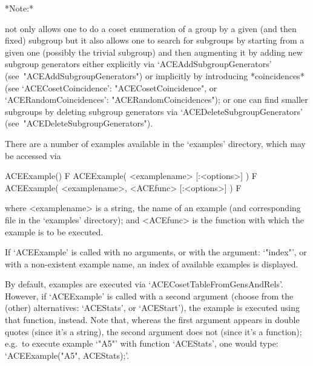 \enditems

*Note:*

{\ACE} not only allows one to do a coset enumeration of a group  by  a
given (and then fixed) subgroup but it also allows one to  search  for
subgroups by starting from a given one (possibly the trivial subgroup)
and then augmenting  it  by  adding  new  subgroup  generators  either
explicitly               via                `ACEAddSubgroupGenerators'
(see~"ACEAddSubgroupGenerators")   or   implicitly   by    introducing
*coincidences*     (see     `ACECosetCoincidence':
"ACECosetCoincidence",           or           `ACERandomCoincidences':
"ACERandomCoincidences");  or  one  can  find  smaller  subgroups   by
deleting   subgroup   generators   via   `ACEDeleteSubgroupGenerators'
(see~"ACEDeleteSubgroupGenerators").


\beginitems

There are a number of examples available in the `examples'  directory,
which may be accessed via

\>ACEExample() F
\>ACEExample( <examplename> [:<options>] ) F
\>ACEExample( <examplename>, <ACEfunc> [:<options>] ) F

where  <examplename>  is  a  string,  the  name  of  an  example  (and
corresponding file in the `examples' directory); and <ACEfunc> is  the
{\ACE} function with which the example is to be executed. 

If `ACEExample' is called with no arguments,  or  with  the  argument:
`"index"', or with a non-existent example name, an index of  available
examples is displayed.

By default, examples are executed via  `ACECosetTableFromGensAndRels'.
However, if `ACEExample' is called with a second argument (choose from
the (other) alternatives: `ACEStats', or `ACEStart'), the  example  is
executed using that function, instead. Note that,  whereas  the  first
argument appears in double quotes (since it's a  string),  the  second
argument does not (since it's a  function);  e.g.~to  execute  example
`"A5"' with function `ACEStats',  one  would  type:  `ACEExample("A5",
ACEStats);'.

